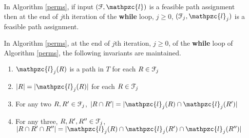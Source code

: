 \documentclass[a4paper,UKenglish,numberwithinsect]{lipics} %
\def\cF{{\cal F}}
\def\cl{\mathpzc{l}}
\begin{document}
\begin{lemma} 
  \label{lem:feasible} In Algorithm \ref{perms}, if input $(\cF, \cl)$ is a
  feasible path assignment then at the end of $j$th iteration of the
  {\bf while} loop, $j \ge 0$, 
  $(\cF_j, \cl_j)$ is a feasible path assignment.
\end{lemma}

\begin{lemma} 
  \label{lem:invar1} In Algorithm \ref{perms}, at the end of $j$th
  iteration, $j \ge 0$, of the {\bf while} loop of Algorithm
  \ref{perms}, the following invariants are maintained.
\begin{enumerate}[{Invariant } I:]
\item $\cl_j(R)$ is a path in $T$ for each $R \in \cF_j$
\item $|R| = |\cl_j(R)|$ for each $R \in \cF_j$
\item For any two $R, R' \in \cF_j$,
  $|R \cap R'| = |\cl_j(R) \cap \cl_j(R')|$
\item For any three, $R, R', R'' \in \cF_j$,
  $|R \cap R' \cap R''|=|\cl_j(R) \cap \cl_j(R') \cap \cl_j(R'')|$
\end{enumerate}
\end{lemma}
\end{document}
